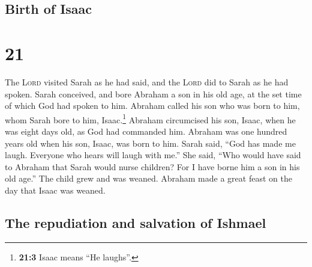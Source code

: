 \hypertarget{birth-of-isaac}{%
\subsection{Birth of Isaac}\label{birth-of-isaac}}

\hypertarget{section-20}{%
\section{21}\label{section-20}}

 The \textsc{Lord} visited Sarah as he had said, and the
\textsc{Lord} did to Sarah as he had spoken.  Sarah
conceived, and bore Abraham a son in his old age, at the set time of
which God had spoken to him.  Abraham called his son who
was born to him, whom Sarah bore to him, Isaac.\footnote{\textbf{21:3}
  Isaac means ``He laughs''.}  Abraham circumcised his
son, Isaac, when he was eight days old, as God had commanded him.
 Abraham was one hundred years old when his son, Isaac,
was born to him.  Sarah said, ``God has made me laugh.
Everyone who hears will laugh with me.''  She said, ``Who
would have said to Abraham that Sarah would nurse children? For I have
borne him a son in his old age.''  The child grew and was
weaned. Abraham made a great feast on the day that Isaac was weaned.

\hypertarget{the-repudiation-and-salvation-of-ishmael}{%
\subsection{The repudiation and salvation of
Ishmael}\label{the-repudiation-and-salvation-of-ishmael}}

